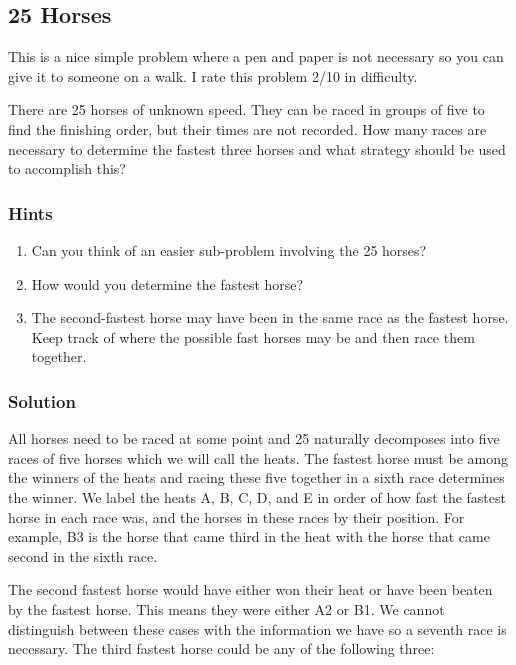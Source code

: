 \subsection{25 Horses}

This is a nice simple problem where a pen and paper is not necessary so you can give it to someone on a walk. I rate this problem 2/10 in difficulty.

There are 25 horses of unknown speed. They can be raced in groups of five to find the finishing order, but their times are not recorded. How many races are necessary to determine the fastest three horses and what strategy should be used to accomplish this?

\subsubsection{Hints}

\begin{enumerate}
	\item Can you think of an easier sub-problem involving the 25 horses?
    \item How would you determine the fastest horse?
    \item The second-fastest horse may have been in the same race as the fastest horse. Keep track of where the possible fast horses may be and then race them together.
\end{enumerate}

\subsubsection{Solution}

All horses need to be raced at some point and 25 naturally decomposes into five races of five horses which we will call the heats. The fastest horse must be among the winners of the heats and racing these five together in a sixth race determines the winner. We label the heats A, B, C, D, and E in order of how fast the fastest horse in each race was, and the horses in these races by their position. For example, B3 is the horse that came third in the heat with the horse that came second in the sixth race.

The second fastest horse would have either won their heat or have been beaten by the fastest horse. This means they were either A2 or B1. We cannot distinguish between these cases with the information we have so a seventh race is necessary. The third fastest horse could be any of the following three:

